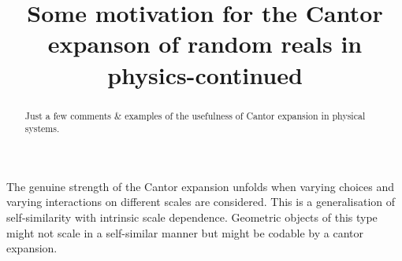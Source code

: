\renewcommand{\baselinestretch}{1.3}






\title{Some motivation for the Cantor expanson of random reals in
physics-continued}
\author{}
\date{ }
\maketitle

\begin{abstract}
Just a few comments \& examples
of the usefulness of Cantor expansion in physical systems.
\end{abstract}




The genuine strength of the Cantor expansion unfolds
when varying choices and varying interactions on different scales are considered.
This is a generalisation of self-similarity with intrinsic scale dependence.
Geometric objects of this type might not scale in a self-similar manner
but might be codable by a cantor expansion.

